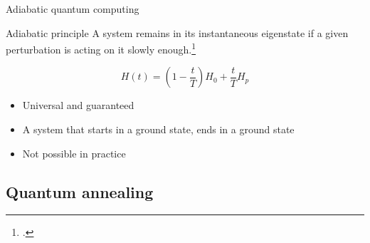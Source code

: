 \documentclass[handout]{beamer}
\begin{document}
\begin{frame}{Adiabatic quantum computing}

    \begin{alertblock}{Adiabatic principle}
        \vspace{0.1em}
        A system remains in its instantaneous eigenstate if a given perturbation is acting on it slowly enough.\footcite{born_beweis_1928}
    \end{alertblock}
    \pause
    \begin{equation*}
        H(t)=\left(1- \frac{t}{T}\right)H_0 + \frac{t}{T}H_p
    \end{equation*}

    \begin{itemize}[<+(1)->]
        \item Universal and guaranteed
        \item A system that starts in a ground state, ends in a ground state
        \item Not possible in practice
    \end{itemize}
    
\end{frame}

\subsection{Quantum annealing}
\end{document}
